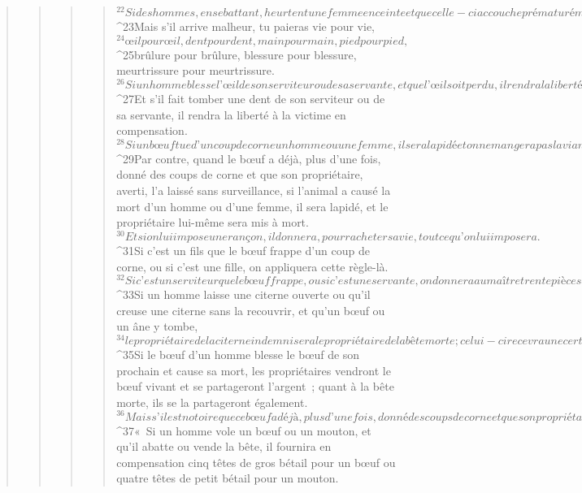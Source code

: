 \begin{verse}
\begin{verse}
\begin{verse}
\begin{verse}
${}^{22}Si des hommes, en se battant, heurtent une femme enceinte et que celle-ci accouche prématurément sans qu’un autre malheur n’arrive, le coupable paiera l’indemnité imposée par le mari, avec l’accord des juges. 
${}^{23}Mais s’il arrive malheur, tu paieras vie pour vie, 
${}^{24}œil pour œil, dent pour dent, main pour main, pied pour pied, 
${}^{25}brûlure pour brûlure, blessure pour blessure, meurtrissure pour meurtrissure.
${}^{26}Si un homme blesse l’œil de son serviteur ou de sa servante, et que l’œil soit perdu, il rendra la liberté à la victime en compensation. 
${}^{27}Et s’il fait tomber une dent de son serviteur ou de sa servante, il rendra la liberté à la victime en compensation.
${}^{28}Si un bœuf tue d’un coup de corne un homme ou une femme, il sera lapidé et on ne mangera pas la viande. Mais le propriétaire sera tenu pour innocent. 
${}^{29}Par contre, quand le bœuf a déjà, plus d’une fois, donné des coups de corne et que son propriétaire, averti, l’a laissé sans surveillance, si l’animal a causé la mort d’un homme ou d’une femme, il sera lapidé, et le propriétaire lui-même sera mis à mort. 
${}^{30}Et si on lui impose une rançon, il donnera, pour racheter sa vie, tout ce qu’on lui imposera. 
${}^{31}Si c’est un fils que le bœuf frappe d’un coup de corne, ou si c’est une fille, on appliquera cette règle-là. 
${}^{32}Si c’est un serviteur que le bœuf frappe, ou si c’est une servante, on donnera au maître trente pièces d’argent, et le bœuf sera lapidé.
${}^{33}Si un homme laisse une citerne ouverte ou qu’il creuse une citerne sans la recouvrir, et qu’un bœuf ou un âne y tombe, 
${}^{34}le propriétaire de la citerne indemnisera le propriétaire de la bête morte ; celui-ci recevra une certaine somme d’argent et celui-là, le cadavre de la bête.
${}^{35}Si le bœuf d’un homme blesse le bœuf de son prochain et cause sa mort, les propriétaires vendront le bœuf vivant et se partageront l’argent ; quant à la bête morte, ils se la partageront également. 
${}^{36}Mais s’il est notoire que ce bœuf a déjà, plus d’une fois, donné des coups de corne et que son propriétaire l’a laissé sans surveillance, celui-ci fournira un bœuf en compensation de la bête morte qui, elle, lui reviendra.
${}^{37}« Si un homme vole un bœuf ou un mouton, et qu’il abatte ou vende la bête, il fournira en compensation cinq têtes de gros bétail pour un bœuf ou quatre têtes de petit bétail pour un mouton.
      

\end{verse}
\end{verse}
\end{verse}
\end{verse}
